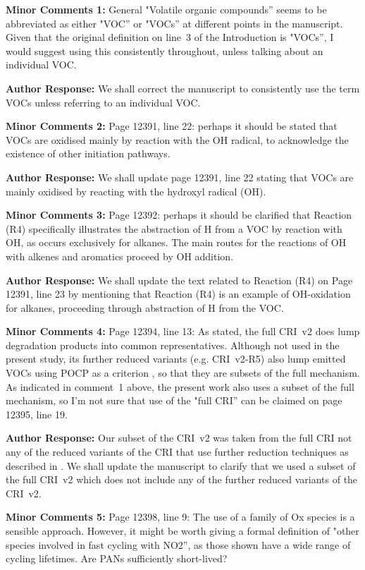 \documentclass{article}
\begin{document}
\textbf{Minor Comments 1:} General "Volatile organic compounds'' seems to be abbreviated as either "VOC'' or "VOCs'' at different points in the manuscript. Given that the original definition on line~3 of the Introduction is "VOCs'', I would suggest using this consistently throughout, unless talking about an individual VOC.

\textbf{Author Response:} We shall correct the manuscript to consistently use the term VOCs unless referring to an individual VOC.

\textbf{Minor Comments 2:} Page 12391, line 22: perhaps it should be stated that VOCs are oxidised mainly by reaction with the OH radical, to acknowledge the existence of other initiation pathways.

\textbf{Author Response:} We shall update page 12391, line 22 stating that VOCs are mainly oxidised by reacting with the hydroxyl radical (OH).

\textbf{Minor Comments 3:} Page 12392: perhaps it should be clarified that Reaction (R4) specifically illustrates the abstraction of H from a VOC by reaction with OH, as occurs exclusively for alkanes. The main routes for the reactions of OH with alkenes and aromatics proceed by OH addition.

\textbf{Author Response:} We shall update the text related to Reaction (R4) on Page 12391, line 23 by mentioning that Reaction (R4) is an example of OH-oxidation for alkanes, proceeding through abstraction of H from the VOC.

\textbf{Minor Comments 4:} Page 12394, line 13: As stated, the full CRI~v2 does lump degradation products into common representatives. Although not used in the present study, its further reduced variants (e.g. CRI~v2-R5) also lump emitted VOCs using POCP as a criterion \citep{Watson:2008}, so that they are subsets of the full mechanism. As indicated in comment~1 above, the present work also uses a subset of the full mechanism, so I’m not sure that use of the "full CRI'' can be claimed on page 12395, line 19.

\textbf{Author Response:} Our subset of the CRI~v2 was taken from the full CRI not any of the reduced variants of the CRI that use further reduction techniques as described in \citet{Watson:2008}.
We shall update the manuscript to clarify that we used a subset of the full CRI~v2 which does not include any of the further reduced variants of the CRI~v2.

\textbf{Minor Comments 5:} Page 12398, line 9: The use of a family of Ox species is a sensible approach. However, it might be worth giving a formal definition of "other species involved in fast cycling with NO2'', as those shown have a wide range of cycling lifetimes. Are PANs sufficiently short-lived?
\end{document}
